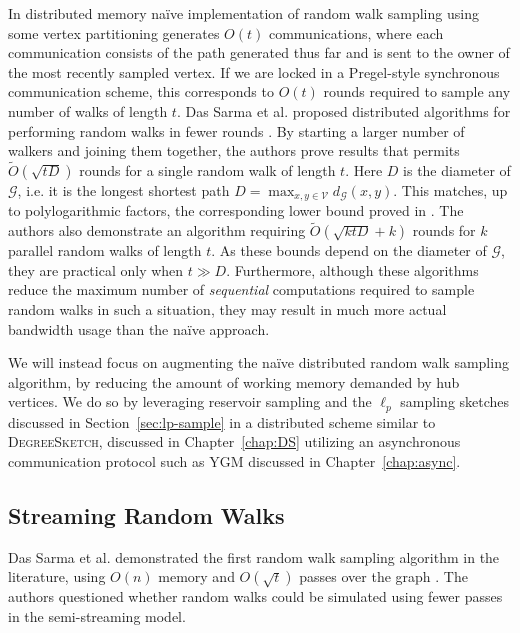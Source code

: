 \documentclass[10]{report}
\newcommand{\algoname}[1]{\textnormal{\textsc{#1}}}
\begin{document}
In distributed memory na\"ive implementation of random walk sampling using some vertex partitioning generates $O(t)$ communications, where each communication consists of the path generated thus far and is sent to the owner of the most recently sampled vertex. 
If we are locked in a Pregel-style synchronous communication scheme, this corresponds to $O(t)$ rounds required to sample any number of walks of length $t$. 
Das Sarma et al. proposed distributed algorithms for performing random walks in fewer rounds \cite{das2013distributed}.
By starting a larger number of walkers and joining them together, the authors prove results that permits $\widetilde{O}(\sqrt{tD})$ rounds for a single random walk of length $t$.
Here $D$ is the diameter of $\mathcal{G}$, i.e. it is the longest shortest path $D = \max_{x, y \in \mathcal{V}} d_{\mathcal{G}}(x,y)$.
This matches, up to polylogarithmic factors, the corresponding lower bound proved in \cite{nanongkai2011tight}.
The authors also demonstrate an algorithm requiring $\widetilde{O}(\sqrt{ktD} + k)$ rounds for $k$ parallel random walks of length $t$.
As these bounds depend on the diameter of $\mathcal{G}$, they are practical only when $t \gg D$. 
Furthermore, although these algorithms reduce the maximum number of \emph{sequential} computations required to sample random walks in such a situation, they may result in much more actual bandwidth usage than the na\"ive approach. 


We will instead focus on augmenting the na\"ive distributed random walk sampling algorithm, by reducing the amount of working memory demanded by hub vertices.
We do so by leveraging reservoir sampling and the $\ell_p$ sampling sketches discussed in Section~\ref{sec:lp-sample} in a distributed scheme similar to \algoname{DegreeSketch}, discussed in Chapter~\ref{chap:DS} utilizing an asynchronous communication protocol such as \algoname{YGM} discussed in Chapter~\ref{chap:async}.

\subsection{Streaming Random Walks}
 \label{walks:sec:streaming:rw}

Das Sarma et al. demonstrated the first random walk sampling algorithm in the literature, using $O(n)$ memory and $O(\sqrt{t})$ passes over the graph \cite{sarma2011estimating}. 
The authors questioned whether random walks could be simulated using fewer passes in the semi-streaming model. 
\end{document}

